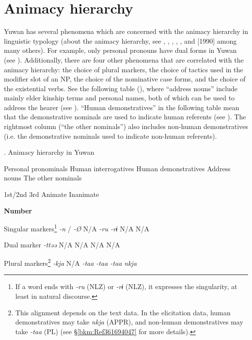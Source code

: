 \section{Animacy hierarchy}

Yuwan has several phenomena which are concerned with the animacy hierarchy in linguistic typology (about the animacy hierarchy, see \citealt{Silverstein1976}, \citealt{Comrie1989}, \citealt{Dixon1994}, \citealt{Whaley1997}, \citealt{Corbett2000}, and \citealt{Croft2003} [1990] among many others). For example, only personal pronouns have dual forms in Yuwan (see ). Additionally, there are four other phenomena that are correlated with the animacy hierarchy: the choice of plural markers, the choice of tactics used in the modifier slot of an NP, the choice of the nominative case forms, and the choice of the existential verbs. See the following table (), where “address nouns” include mainly elder kinship terms and personal names, both of which can be used to address the hearer (see ). “Human demonstratives” in the following table mean that the demonstrative nominals are used to indicate human referents (see ). The rightmost column (“the other nominals”) also includes non-human demonstratives (i.e. the demonstrative nominals used to indicate non-human referents).

\begin{styleBeschriftung}
\textmd{}\textmd{. Animacy hierarchy in Yuwan}
\end{styleBeschriftung}

  Personal pronominals  Human interrogatives  Human demonstratives  Address nouns  The other nominals

  1st/2nd  3rd        Animate  Inanimate

\textbf{Number}          

Singular markers\footnote{If a word ends with \textit{{}-ru} (NLZ) or \textit{{}-rɨ} (NLZ), it expresses the singularity, at least in natural discourse.}  \textit{{}-n} / \textit{-Ø}  N/A  \textit{{}-ru  {}-rɨ} N/A  N/A

Dual marker     \textit{{}-ttəə} N/A  N/A  N/A  N/A

Plural markers\footnote{This alignment depends on the text data. In the elicitation data, human demonstratives may take \textit{nkja} (APPR), and non-human demonstratives may take \textit{{}-taa} (PL) (see §\ref{bkm:Ref361694047} for more details).}  \textit{{}-kja} N/A  \textit{{}-taa  {}-taa  {}-taa  nkja}

